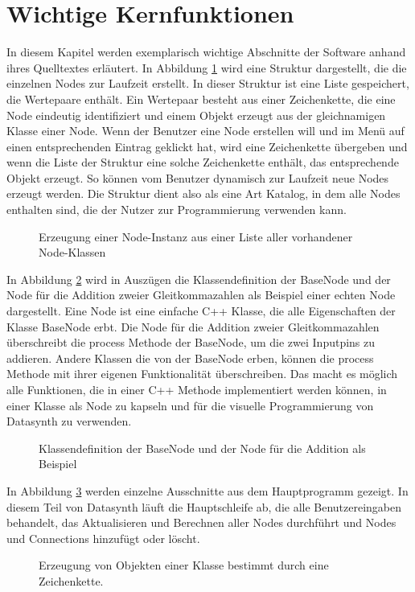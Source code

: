 \documentclass[a4paper, 12pt, DIV=calc, version=first, pdftex, headsepline, footsepline, bibtotocnumbered, liststotocnumbered]{scrreprt}
\begin{document}
\section{Wichtige Kernfunktionen}
\label{sec:Kernfunktionen}
In diesem Kapitel werden exemplarisch wichtige Abschnitte der Software anhand ihres Quelltextes
erläutert.
In Abbildung \ref{fig:factory} wird eine Struktur dargestellt, die die einzelnen
Nodes zur Laufzeit erstellt. In dieser Struktur ist eine Liste gespeichert, die Wertepaare
enthält. Ein Wertepaar besteht aus einer Zeichenkette, die eine Node eindeutig identifiziert
und einem Objekt erzeugt aus der gleichnamigen Klasse einer Node.
Wenn der Benutzer eine Node erstellen will und im Menü auf einen entsprechenden Eintrag geklickt hat,
wird eine Zeichenkette übergeben und wenn die Liste der Struktur eine solche Zeichenkette enthält, das
entsprechende Objekt erzeugt. So können vom Benutzer dynamisch zur Laufzeit
neue Nodes erzeugt werden. Die Struktur dient also als eine Art Katalog, in dem alle
Nodes enthalten sind, die der Nutzer zur Programmierung verwenden kann.
\begin{figure}
\centering

\caption{Erzeugung einer Node-Instanz aus einer Liste aller vorhandener Node-Klassen}
\label{fig:factory}
\end{figure}

In Abbildung \ref{fig:node} wird in Auszügen die Klassendefinition der BaseNode und
der Node für die Addition zweier Gleitkommazahlen als Beispiel einer echten Node dargestellt.
Eine Node ist eine einfache C++ Klasse, die alle Eigenschaften der Klasse BaseNode erbt.
Die Node für die Addition zweier Gleitkommazahlen überschreibt die process Methode der BaseNode, um die zwei
Inputpins zu addieren. Andere Klassen die von der BaseNode erben, können die process
Methode mit ihrer eigenen Funktionalität überschreiben.
Das macht es möglich alle Funktionen, die in einer C++ Methode implementiert werden können,
in einer Klasse als Node zu kapseln und für die visuelle Programmierung von Datasynth zu verwenden.
\begin{figure}
\centering

\caption{Klassendefinition der BaseNode und der Node für die Addition als Beispiel}
\label{fig:node}
\end{figure}

In Abbildung \ref{fig:core} werden einzelne Ausschnitte aus dem Hauptprogramm gezeigt.
In diesem Teil von Datasynth läuft die Hauptschleife ab, die alle Benutzereingaben behandelt,
das Aktualisieren und Berechnen aller Nodes durchführt und Nodes und Connections
hinzufügt oder löscht.
\begin{figure}
\centering

\caption{Erzeugung von Objekten einer Klasse bestimmt durch eine Zeichenkette.}
\label{fig:core}
\end{figure}
\end{document}
